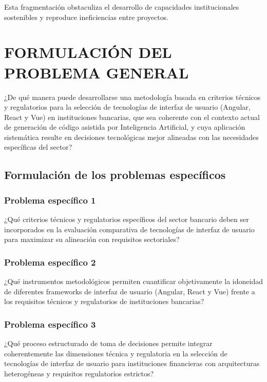Esta fragmentación obstaculiza el desarrollo de capacidades institucionales
sostenibles y reproduce ineficiencias entre proyectos.


\section{FORMULACIÓN DEL PROBLEMA GENERAL}


¿De qué manera puede desarrollarse una metodología basada en criterios
técnicos y regulatorios para la selección de tecnologías de interfaz de usuario
(Angular, React y Vue) en instituciones bancarias, que sea coherente con el
contexto actual de generación de código asistida por Inteligencia Artificial, y
cuya aplicación sistemática resulte en decisiones tecnológicas mejor
alineadas con las necesidades específicas del sector?


\subsection{Formulación de los problemas específicos}

\subsubsection{Problema específico 1}

¿Qué criterios técnicos y regulatorios específicos del sector bancario
        deben ser incorporados en la evaluación comparativa de tecnologías de
        interfaz de usuario para maximizar su alineación con requisitos
        sectoriales?

\subsubsection{Problema específico 2}

¿Qué instrumentos metodológicos permiten cuantificar objetivamente la
        idoneidad de diferentes frameworks de interfaz de usuario (Angular,
        React y Vue) frente a los requisitos técnicos y regulatorios de
        instituciones bancarias?

\subsubsection{Problema específico 3}

¿Qué proceso estructurado de toma de decisiones permite integrar
        coherentemente las dimensiones técnica y regulatoria en la selección
        de tecnologías de interfaz de usuario para instituciones financieras
        con arquitecturas heterogéneas y requisitos regulatorios estrictos?

